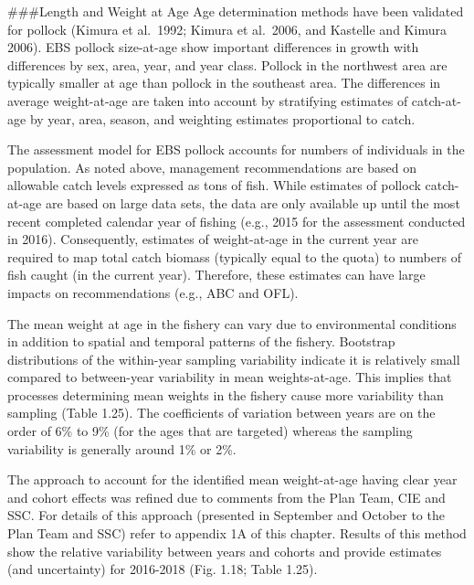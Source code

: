 \#\#\#Length and Weight at Age Age determination methods have been
validated for pollock (Kimura et al.~1992; Kimura et al.~2006, and
Kastelle and Kimura 2006). EBS pollock size-at-age show important
differences in growth with differences by sex, area, year, and year
class. Pollock in the northwest area are typically smaller at age than
pollock in the southeast area. The differences in average weight-at-age
are taken into account by stratifying estimates of catch-at-age by year,
area, season, and weighting estimates proportional to catch.

The assessment model for EBS pollock accounts for numbers of individuals
in the population. As noted above, management recommendations are based
on allowable catch levels expressed as tons of fish. While estimates of
pollock catch-at-age are based on large data sets, the data are only
available up until the most recent completed calendar year of fishing
(e.g., 2015 for the assessment conducted in 2016). Consequently,
estimates of weight-at-age in the current year are required to map total
catch biomass (typically equal to the quota) to numbers of fish caught
(in the current year). Therefore, these estimates can have large impacts
on recommendations (e.g., ABC and OFL).

The mean weight at age in the fishery can vary due to environmental
conditions in addition to spatial and temporal patterns of the fishery.
Bootstrap distributions of the within-year sampling variability indicate
it is relatively small compared to between-year variability in mean
weights-at-age. This implies that processes determining mean weights in
the fishery cause more variability than sampling (Table 1.25). The
coefficients of variation between years are on the order of 6\% to 9\%
(for the ages that are targeted) whereas the sampling variability is
generally around 1\% or 2\%.

The approach to account for the identified mean weight-at-age having
clear year and cohort effects was refined due to comments from the Plan
Team, CIE and SSC. For details of this approach (presented in September
and October to the Plan Team and SSC) refer to appendix 1A of this
chapter. Results of this method show the relative variability between
years and cohorts and provide estimates (and uncertainty) for 2016-2018
(Fig. 1.18; Table 1.25).

